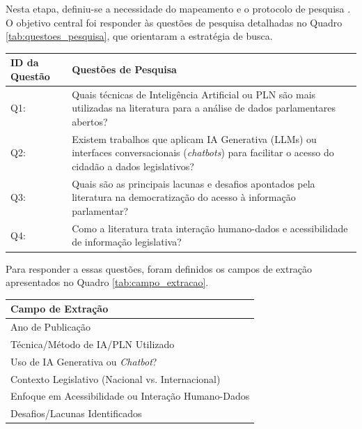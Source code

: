 Nesta etapa, definiu-se a necessidade do mapeamento e o protocolo de pesquisa \cite{Brereton2007}. O objetivo central foi responder às questões de pesquisa detalhadas no Quadro \ref{tab:questoes_pesquisa}, que orientaram a estratégia de busca.

\begin{quadro}[H]
    \centering
    \caption{Questões de Pesquisa do Mapeamento Sistemático}
    \label{tab:questoes_pesquisa}
    \begin{tabular}{p{3cm}p{10cm}}
    \toprule
    \textbf{ID da Questão} & \textbf{Questões de Pesquisa} \\
    \midrule
    Q1: & Quais técnicas de Inteligência Artificial ou PLN são mais utilizadas na literatura para a análise de dados parlamentares abertos? \\
    Q2: & Existem trabalhos que aplicam IA Generativa (LLMs) ou interfaces conversacionais (\textit{chatbots}) para facilitar o acesso do cidadão a dados legislativos? \\
    Q3: & Quais são as principais lacunas e desafios apontados pela literatura na democratização do acesso à informação parlamentar? \\
    Q4: & Como a literatura trata interação humano-dados e acessibilidade de informação legislativa? \\
    \bottomrule
    \end{tabular}
\end{quadro}

Para responder a essas questões, foram definidos os campos de extração apresentados no Quadro \ref{tab:campo_extracao}.

\begin{quadro}[H]
    \centering
    \caption{Campos de Extração de Dados}
    \label{tab:campo_extracao}
    \begin{tabular}{p{10cm}}
    \toprule
    \textbf{Campo de Extração} \\
    \midrule
    Ano de Publicação \\
    Técnica/Método de IA/PLN Utilizado \\
    Uso de IA Generativa ou \textit{Chatbot}? \\
    Contexto Legislativo (Nacional vs. Internacional) \\
    Enfoque em Acessibilidade ou Interação Humano-Dados \\
    Desafios/Lacunas Identificados \\
    \bottomrule
    \end{tabular}
\end{quadro}

